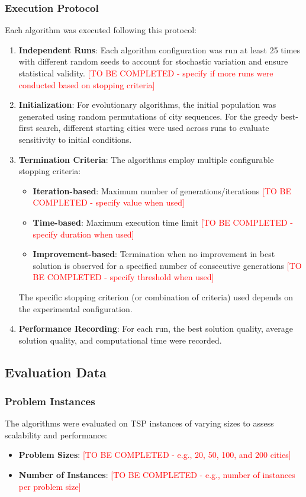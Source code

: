 \documentclass{scrartcl}
\begin{document}
\subsubsection{Execution Protocol}
Each algorithm was executed following this protocol:
\begin{enumerate}
    \item \textbf{Independent Runs}: Each algorithm configuration was run at least 25 times with different random seeds to account for stochastic variation and ensure statistical validity. \textcolor{red}{[TO BE COMPLETED - specify if more runs were conducted based on stopping criteria]}
    \item \textbf{Initialization}: For evolutionary algorithms, the initial population was generated using random permutations of city sequences. For the greedy best-first search, different starting cities were used across runs to evaluate sensitivity to initial conditions.
    \item \textbf{Termination Criteria}: The algorithms employ multiple configurable stopping criteria:
    \begin{itemize}
        \item \textbf{Iteration-based}: Maximum number of generations/iterations \textcolor{red}{[TO BE COMPLETED - specify value when used]}
        \item \textbf{Time-based}: Maximum execution time limit \textcolor{red}{[TO BE COMPLETED - specify duration when used]}
        \item \textbf{Improvement-based}: Termination when no improvement in best solution is observed for a specified number of consecutive generations \textcolor{red}{[TO BE COMPLETED - specify threshold when used]}
    \end{itemize}
    The specific stopping criterion (or combination of criteria) used depends on the experimental configuration.
    \item \textbf{Performance Recording}: For each run, the best solution quality, average solution quality, and computational time were recorded.
\end{enumerate}

\subsection{Evaluation Data}

\subsubsection{Problem Instances}
The algorithms were evaluated on TSP instances of varying sizes to assess scalability and performance:
\begin{itemize}
    \item \textbf{Problem Sizes}: \textcolor{red}{[TO BE COMPLETED - e.g., 20, 50, 100, and 200 cities]}
    \item \textbf{Number of Instances}: \textcolor{red}{[TO BE COMPLETED - e.g., number of instances per problem size]}
\end{itemize}
\end{document}
